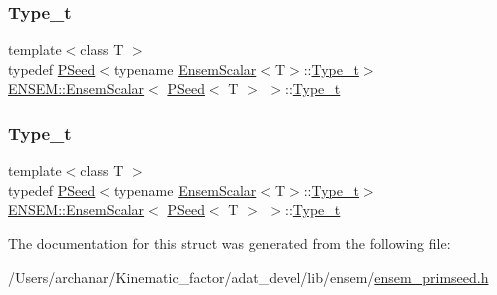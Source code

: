 \subsubsection{\texorpdfstring{Type\_t}{Type\_t}\hspace{0.1cm}{\footnotesize\ttfamily [1/2]}}
{\footnotesize\ttfamily template$<$class T $>$ \\
typedef \mbox{\hyperlink{classENSEM_1_1PSeed}{P\+Seed}}$<$typename \mbox{\hyperlink{structENSEM_1_1EnsemScalar}{Ensem\+Scalar}}$<$T$>$\+::\mbox{\hyperlink{structENSEM_1_1EnsemScalar_3_01PSeed_3_01T_01_4_01_4_abb7f97324ea0068fcbf50343784cd95c}{Type\+\_\+t}}$>$ \mbox{\hyperlink{structENSEM_1_1EnsemScalar}{E\+N\+S\+E\+M\+::\+Ensem\+Scalar}}$<$ \mbox{\hyperlink{classENSEM_1_1PSeed}{P\+Seed}}$<$ T $>$ $>$\+::\mbox{\hyperlink{structENSEM_1_1EnsemScalar_3_01PSeed_3_01T_01_4_01_4_abb7f97324ea0068fcbf50343784cd95c}{Type\+\_\+t}}}

\mbox{\label{structENSEM_1_1EnsemScalar_3_01PSeed_3_01T_01_4_01_4_abb7f97324ea0068fcbf50343784cd95c}} 
\subsubsection{\texorpdfstring{Type\_t}{Type\_t}\hspace{0.1cm}{\footnotesize\ttfamily [2/2]}}
{\footnotesize\ttfamily template$<$class T $>$ \\
typedef \mbox{\hyperlink{classENSEM_1_1PSeed}{P\+Seed}}$<$typename \mbox{\hyperlink{structENSEM_1_1EnsemScalar}{Ensem\+Scalar}}$<$T$>$\+::\mbox{\hyperlink{structENSEM_1_1EnsemScalar_3_01PSeed_3_01T_01_4_01_4_abb7f97324ea0068fcbf50343784cd95c}{Type\+\_\+t}}$>$ \mbox{\hyperlink{structENSEM_1_1EnsemScalar}{E\+N\+S\+E\+M\+::\+Ensem\+Scalar}}$<$ \mbox{\hyperlink{classENSEM_1_1PSeed}{P\+Seed}}$<$ T $>$ $>$\+::\mbox{\hyperlink{structENSEM_1_1EnsemScalar_3_01PSeed_3_01T_01_4_01_4_abb7f97324ea0068fcbf50343784cd95c}{Type\+\_\+t}}}



The documentation for this struct was generated from the following file\+:\begin{DoxyCompactItemize}
\item 
/\+Users/archanar/\+Kinematic\+\_\+factor/adat\+\_\+devel/lib/ensem/\mbox{\hyperlink{lib_2ensem_2ensem__primseed_8h}{ensem\+\_\+primseed.\+h}}\end{DoxyCompactItemize}
